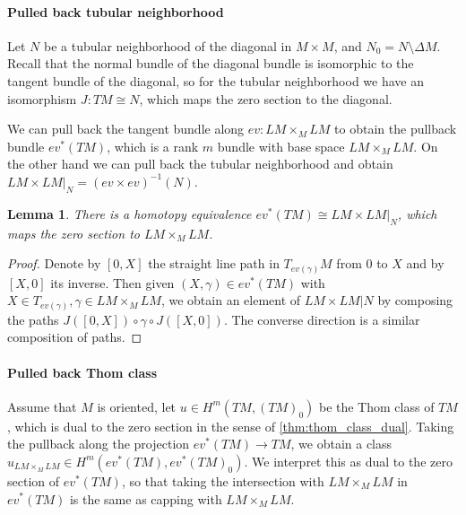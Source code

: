 \documentclass{scrartcl}
\theoremstyle{plain}
\newtheorem{lemma}[theorem]{Lemma}
\theoremstyle{definition}
\newcommand{\iso}{\cong}
\begin{document}
\paragraph{Pulled back tubular neighborhood} Let $N$ be a tubular neighborhood of the diagonal in $M\times M$, and $N_0 = N\setminus \Delta M$. Recall that the normal bundle of the diagonal bundle is isomorphic to the tangent bundle of the diagonal, so for the tubular neighborhood we have an isomorphism $J\colon TM\iso N$, which maps the zero section to the diagonal. 

We can pull back the tangent bundle along $ev\colon LM\times_M LM$ to obtain the pullback bundle $ev^*(TM)$, which is a rank $m$ bundle with base space $LM\times_M LM$. On the other hand we can pull back the tubular neighborhood and obtain $LM\times LM|_N = (ev\times ev)^{-1}(N)$. \begin{lemma}
    There is a homotopy equivalence $ev^*(TM) \iso LM\times LM|_N$, which maps the zero section to $LM\times_M LM$. 
\end{lemma}
\begin{proof}
    Denote by $[0, X]$ the straight line path in $T_{ev(\gamma)}M$ from $0$ to $X$ and by $[X, 0]$ its inverse. Then given $(X, \gamma)\in ev^*(TM)$ with $X\in T_{ev(\gamma)}, \gamma\in LM\times_M LM$, we obtain an element of $LM\times LM|N$ by composing the paths $J([0, X]) \circ \gamma \circ J([X, 0])$. The converse direction is a similar composition of paths.
\end{proof}

\paragraph{Pulled back Thom class}

Assume that $M$ is oriented, let $u\in H^m(TM, (TM)_0)$ be the Thom class of $TM$, which is dual to the zero section in the sense of \ref{thm:thom_class_dual}. Taking the pullback along the projection $ev^*(TM)\to TM$, we obtain a class $u_{LM\times_M LM} \in H^m(ev^*(TM), ev^*(TM)_0)$. We interpret this as dual to the zero section of $ev^*(TM)$, so that taking the intersection with $LM\times_M LM$ in $ev^*(TM)$ is the same as capping with $LM\times_M LM$.

\end{document}
